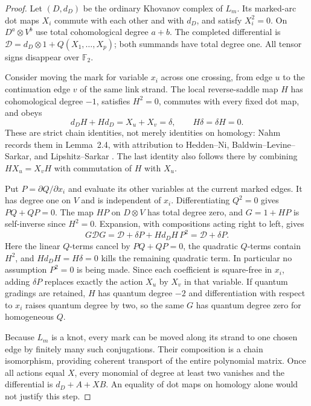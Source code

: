 \begin{proof}
Let $(D,d_D)$ be the ordinary Khovanov complex of $L_m$. Its marked-arc
dot maps $X_i$ commute with each other and with $d_D$, and satisfy
$X_i^2=0$. On $D^a\otimes V^b$ use total cohomological degree $a+b$.
The completed differential is
$\mathcal D=d_D\otimes1+Q(X_1,\ldots,X_p)$; both summands have total
degree one. All tensor signs disappear over $\mathbb F_2$.

Consider moving the mark for variable $x_i$ across one crossing, from
edge $u$ to the continuation edge $v$ of the same link strand.
The local reverse-saddle map $H$ has cohomological degree $-1$,
satisfies $H^2=0$, commutes with every fixed dot map, and obeys
\[
 d_DH+Hd_D=X_u+X_v=\delta,\qquad H\delta=\delta H=0.
\]
These are strict chain identities, not merely identities on homology:
Nahm records them in Lemma~2.4, with attribution to
Hedden--Ni, Baldwin--Levine--Sarkar, and Lipshitz--Sarkar
\cite{Nahm2026Basepoints}. The last identity also follows there by combining
$HX_u=X_vH$ with commutation of $H$ with $X_u$.

Put $P=\partial Q/\partial x_i$ and evaluate its other variables at the
current marked edges. It has degree one on $V$ and is independent of
$x_i$. Differentiating $Q^2=0$ gives $PQ+QP=0$. The map $HP$ on
$D\otimes V$ has total degree zero, and
$G=1+HP$ is self-inverse since $H^2=0$.
Expansion, with compositions acting right to left, gives
\[
 G\mathcal D G
 =\mathcal D+\delta P+Hd_DH\,P^2
 =\mathcal D+\delta P .
\]
Here the linear $Q$-terms cancel by $PQ+QP=0$, the quadratic
$Q$-terms contain $H^2$, and
$Hd_DH=H\delta=0$ kills the remaining quadratic term.
In particular no assumption $P^2=0$ is being made.
Since each coefficient is square-free in $x_i$, adding $\delta P$
replaces exactly the action $X_u$ by $X_v$ in that variable.
If quantum gradings are retained, $H$ has quantum degree $-2$ and
differentiation with respect to $x_i$ raises quantum degree by two,
so the same $G$ has quantum degree zero for homogeneous $Q$.

Because $L_m$ is a knot, every mark can be moved along its strand to
one chosen edge by finitely many such conjugations. Their composition
is a chain isomorphism, providing coherent transport of the entire
polynomial matrix. Once all actions equal $X$, every monomial of
degree at least two vanishes and the differential is $d_D+A+XB$.
An equality of dot maps on homology alone would not justify this step.


\end{proof}
